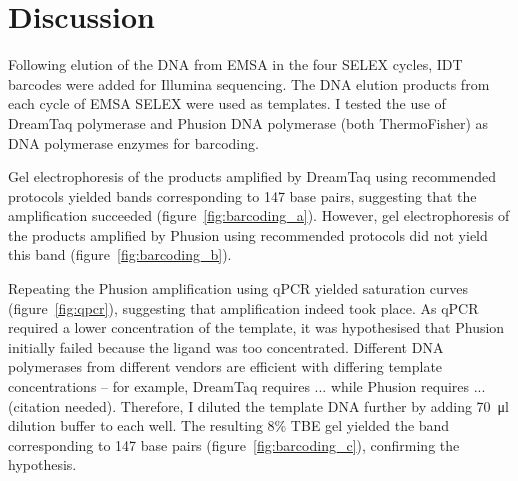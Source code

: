 \documentclass[parskip=full, numbers=noenddot]{scrreprt}
\begin{document}

\section{Discussion}
\label{sec:emsaselex_discussion}


Following elution of the DNA from EMSA in the four SELEX cycles, IDT barcodes were added for Illumina sequencing. The DNA elution products from each cycle of EMSA SELEX were used as templates. I tested the use of DreamTaq polymerase and Phusion DNA polymerase (both ThermoFisher) as DNA polymerase enzymes for barcoding.

Gel electrophoresis of the products amplified by DreamTaq using recommended protocols yielded bands corresponding to 147 base pairs, suggesting that the amplification succeeded (figure~\ref{fig:barcoding_a}). However, gel electrophoresis of the products amplified by Phusion using recommended protocols did not yield this band (figure~\ref{fig:barcoding_b}).

Repeating the Phusion amplification using qPCR yielded saturation curves (figure~\ref{fig:qpcr}), suggesting that amplification indeed took place. As qPCR required a lower concentration of the template, it was hypothesised that Phusion initially failed because the ligand was too concentrated. Different DNA polymerases from different vendors are efficient with differing template concentrations – for example, DreamTaq requires ... while Phusion requires ... (citation needed). Therefore, I diluted the template DNA further by adding \SI{70}{\micro\litre} dilution buffer to each well. The resulting 8\% TBE gel yielded the band corresponding to 147 base pairs (figure~\ref{fig:barcoding_c}), confirming the hypothesis.
\end{document}
